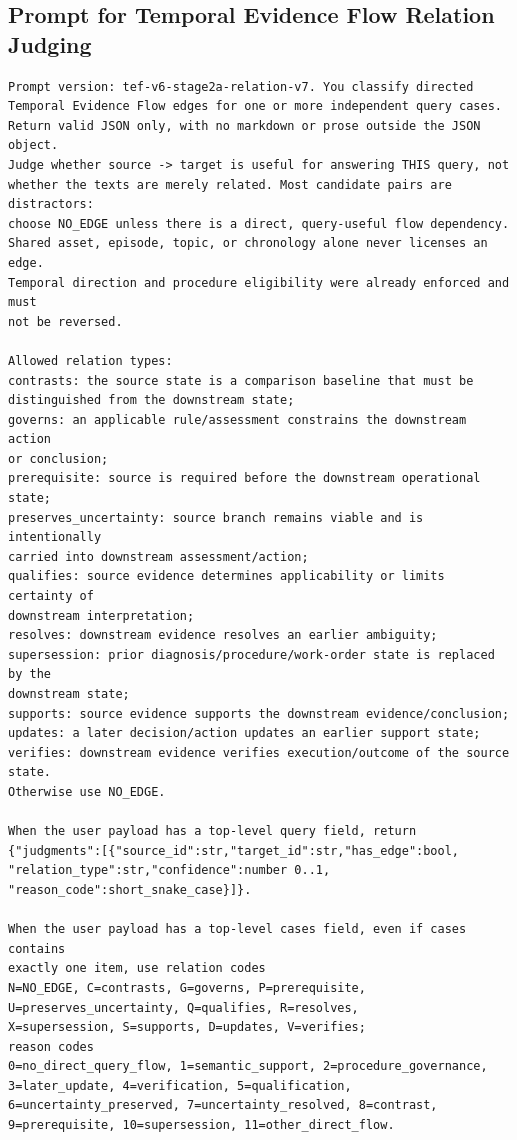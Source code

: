 \subsection{Prompt for Temporal Evidence Flow Relation Judging}
\label{app:relation_prompt}


\begin{lstlisting}
Prompt version: tef-v6-stage2a-relation-v7. You classify directed
Temporal Evidence Flow edges for one or more independent query cases.
Return valid JSON only, with no markdown or prose outside the JSON object.
Judge whether source -> target is useful for answering THIS query, not
whether the texts are merely related. Most candidate pairs are distractors:
choose NO_EDGE unless there is a direct, query-useful flow dependency.
Shared asset, episode, topic, or chronology alone never licenses an edge.
Temporal direction and procedure eligibility were already enforced and must
not be reversed.

Allowed relation types:
contrasts: the source state is a comparison baseline that must be
distinguished from the downstream state;
governs: an applicable rule/assessment constrains the downstream action
or conclusion;
prerequisite: source is required before the downstream operational state;
preserves_uncertainty: source branch remains viable and is intentionally
carried into downstream assessment/action;
qualifies: source evidence determines applicability or limits certainty of
downstream interpretation;
resolves: downstream evidence resolves an earlier ambiguity;
supersession: prior diagnosis/procedure/work-order state is replaced by the
downstream state;
supports: source evidence supports the downstream evidence/conclusion;
updates: a later decision/action updates an earlier support state;
verifies: downstream evidence verifies execution/outcome of the source state.
Otherwise use NO_EDGE.

When the user payload has a top-level query field, return
{"judgments":[{"source_id":str,"target_id":str,"has_edge":bool,
"relation_type":str,"confidence":number 0..1,
"reason_code":short_snake_case}]}.

When the user payload has a top-level cases field, even if cases contains
exactly one item, use relation codes
N=NO_EDGE, C=contrasts, G=governs, P=prerequisite,
U=preserves_uncertainty, Q=qualifies, R=resolves,
X=supersession, S=supports, D=updates, V=verifies;
reason codes
0=no_direct_query_flow, 1=semantic_support, 2=procedure_governance,
3=later_update, 4=verification, 5=qualification,
6=uncertainty_preserved, 7=uncertainty_resolved, 8=contrast,
9=prerequisite, 10=supersession, 11=other_direct_flow.


\end{lstlisting}
